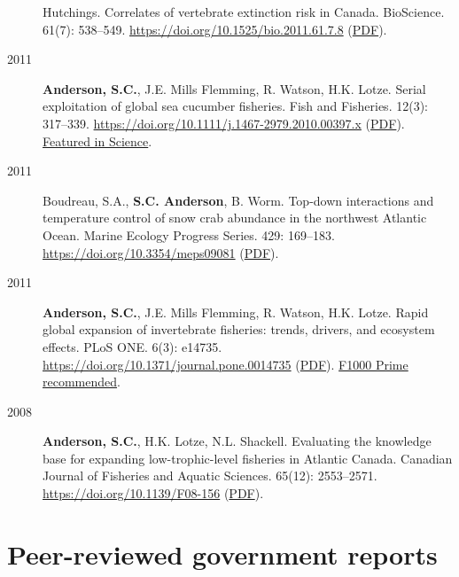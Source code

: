 \begin{description}
Hutchings. Correlates of vertebrate extinction risk in Canada.
BioScience. 61(7): 538--549.
\url{https://doi.org/10.1525/bio.2011.61.7.8}
(\href{https://www.dropbox.com/s/bt16dvi3idw3gdx/Anderson_etal_2011_BioScience_with_supplement.pdf?dl=1}{PDF}).
\item[2011]
\textbf{Anderson, S.C.}, J.E. Mills Flemming, R. Watson, H.K. Lotze.
Serial exploitation of global sea cucumber fisheries. Fish and
Fisheries. 12(3): 317--339.
\url{https://doi.org/10.1111/j.1467-2979.2010.00397.x}
(\href{https://www.dropbox.com/s/d8id4zxe9xv6jau/Anderson_etal_2011_seacucumbers_with_supplement.pdf?dl=1}{PDF}).
\href{http://www.sciencemag.org/content/331/6014/129.1.full}{Featured in
Science}.
\item[2011]
Boudreau, S.A., \textbf{S.C. Anderson}, B. Worm. Top-down interactions
and temperature control of snow crab abundance in the northwest Atlantic
Ocean. Marine Ecology Progress Series. 429: 169--183.
\url{https://doi.org/10.3354/meps09081}
(\href{http://www.int-res.com/articles/meps_oa/m429p169.pdf}{PDF}).
\item[2011]
\textbf{Anderson, S.C.}, J.E. Mills Flemming, R. Watson, H.K. Lotze.
Rapid global expansion of invertebrate fisheries: trends, drivers, and
ecosystem effects. PLoS ONE. 6(3): e14735.
\url{https://doi.org/10.1371/journal.pone.0014735}
(\href{http://www.plosone.org/article/fetchObject.action?uri=info\%3Adoi\%2F10.1371\%2Fjournal.pone.0014735\&representation=PDF}{PDF}).
\href{https://f1000.com/prime/9542957}{F1000 Prime recommended}.
\item[2008]
\textbf{Anderson, S.C.}, H.K. Lotze, N.L. Shackell. Evaluating the
knowledge base for expanding low-trophic-level fisheries in Atlantic
Canada. Canadian Journal of Fisheries and Aquatic Sciences. 65(12):
2553--2571. \url{https://doi.org/10.1139/F08-156}
(\href{https://www.dropbox.com/s/b0la81jbqitib6u/Anderson_etal_2008_knowledge.pdf?dl=1}{PDF}).
\end{description}

\hypertarget{peer-reviewed-government-reports}{%
\section{Peer-reviewed government
reports}\label{peer-reviewed-government-reports}}

